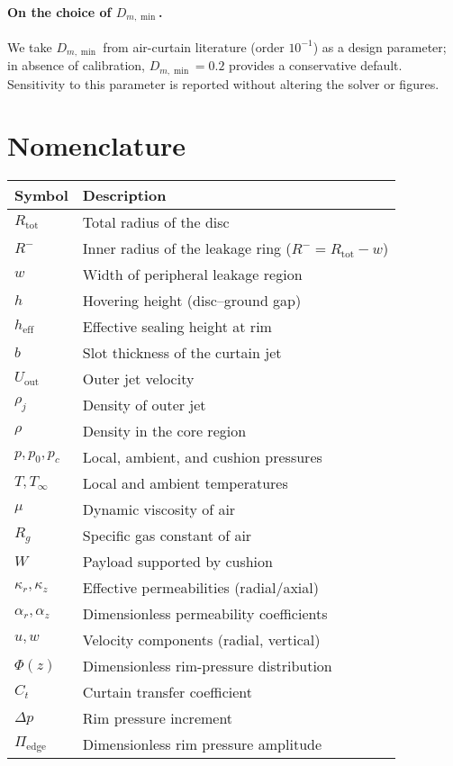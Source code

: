 \documentclass[11pt,a4paper]{article}
\begin{document}
\paragraph{On the choice of $D_{m,\min}$.}
We take $D_{m,\min}$ from air-curtain literature (order $10^{-1}$) as a design parameter; in absence of calibration, $D_{m,\min}=0.2$ provides a conservative default. 
Sensitivity to this parameter is reported without altering the solver or figures.
\section{Nomenclature}
\begin{tabular}{@{}ll@{}}
\toprule
Symbol & Description \\ \midrule
$R_{\mathrm{tot}}$ & Total radius of the disc \\
$R^{-}$ & Inner radius of the leakage ring ($R^{-}=R_{\mathrm{tot}}-w$) \\
$w$ & Width of peripheral leakage region \\
$h$ & Hovering height (disc--ground gap) \\
$h_{\mathrm{eff}}$ & Effective sealing height at rim \\
$b$ & Slot thickness of the curtain jet \\
$U_{\mathrm{out}}$ & Outer jet velocity \\
$\rho_j$ & Density of outer jet \\
$\rho$ & Density in the core region \\
$p,p_0,p_c$ & Local, ambient, and cushion pressures \\
$T,T_\infty$ & Local and ambient temperatures \\
$\mu$ & Dynamic viscosity of air \\
$R_g$ & Specific gas constant of air \\
$W$ & Payload supported by cushion \\
$\kappa_r,\kappa_z$ & Effective permeabilities (radial/axial) \\
$\alpha_r,\alpha_z$ & Dimensionless permeability coefficients \\
$u,w$ & Velocity components (radial, vertical) \\
$\Phi(z)$ & Dimensionless rim-pressure distribution \\
$C_t$ & Curtain transfer coefficient \\
$\Delta p$ & Rim pressure increment \\
$\Pi_{\mathrm{edge}}$ & Dimensionless rim pressure amplitude \\

\end{tabular}
\end{document}
